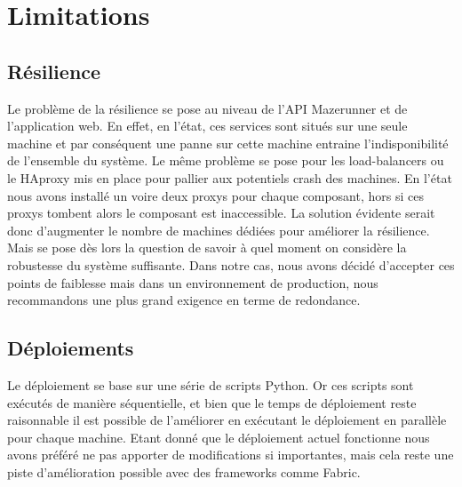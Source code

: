\section{Limitations}

\subsection{Résilience}

Le problème de la résilience se pose au niveau de l'API Mazerunner et de l'application web. En effet, en l'état, ces services sont situés sur une seule machine et par conséquent une panne sur cette machine entraine l'indisponibilité de l'ensemble du système. Le même problème se pose pour les load-balancers ou le HAproxy mis en place pour pallier aux potentiels crash des machines. En l'état nous avons installé un voire deux proxys pour chaque composant, hors si ces proxys tombent alors le composant est inaccessible. La solution évidente serait donc d'augmenter le nombre de machines dédiées pour améliorer la résilience. Mais se pose dès lors la question de savoir à quel moment on considère la robustesse du système suffisante. Dans notre cas, nous avons décidé d'accepter ces points de faiblesse mais dans un environnement de production, nous recommandons une plus grand exigence en terme de redondance.

\subsection{Déploiements}

Le déploiement se base sur une série de scripts Python.
Or ces scripts sont exécutés de manière séquentielle, et bien que le temps de déploiement reste raisonnable il est possible de l'améliorer en exécutant le déploiement en parallèle pour chaque machine.
Etant donné que le déploiement actuel fonctionne nous avons préféré ne pas apporter de modifications si importantes, mais cela reste une piste d'amélioration possible avec des frameworks comme Fabric.

